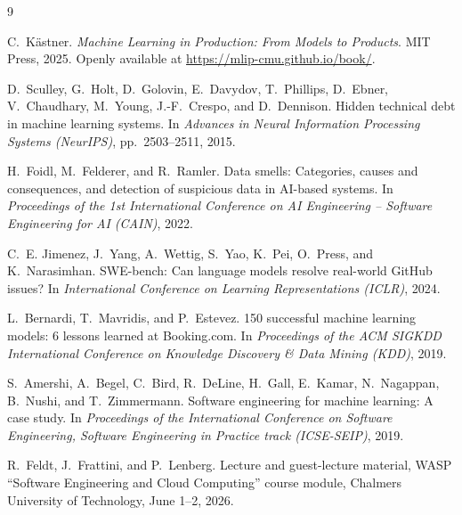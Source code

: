 \documentclass[11pt,a4paper]{article}
\begin{document}
\begin{thebibliography}{9}\itemsep2pt 

C.~K\"astner.
\emph{Machine Learning in Production: From Models to Products}.
MIT Press, 2025. Openly available at \url{https://mlip-cmu.github.io/book/}.

D.~Sculley, G.~Holt, D.~Golovin, E.~Davydov, T.~Phillips, D.~Ebner, V.~Chaudhary, M.~Young, J.-F.~Crespo, and D.~Dennison.
Hidden technical debt in machine learning systems.
In \emph{Advances in Neural Information Processing Systems (NeurIPS)}, pp.~2503--2511, 2015.

H.~Foidl, M.~Felderer, and R.~Ramler.
Data smells: Categories, causes and consequences, and detection of suspicious data in AI-based systems.
In \emph{Proceedings of the 1st International Conference on AI Engineering -- Software Engineering for AI (CAIN)}, 2022.

C.~E. Jimenez, J.~Yang, A.~Wettig, S.~Yao, K.~Pei, O.~Press, and K.~Narasimhan.
SWE-bench: Can language models resolve real-world GitHub issues?
In \emph{International Conference on Learning Representations (ICLR)}, 2024.

L.~Bernardi, T.~Mavridis, and P.~Estevez.
150 successful machine learning models: 6 lessons learned at Booking.com.
In \emph{Proceedings of the ACM SIGKDD International Conference on Knowledge Discovery \& Data Mining (KDD)}, 2019.

S.~Amershi, A.~Begel, C.~Bird, R.~DeLine, H.~Gall, E.~Kamar, N.~Nagappan, B.~Nushi, and T.~Zimmermann.
Software engineering for machine learning: A case study.
In \emph{Proceedings of the International Conference on Software Engineering, Software Engineering in Practice track (ICSE-SEIP)}, 2019.

R.~Feldt, J.~Frattini, and P.~Lenberg.
Lecture and guest-lecture material, WASP ``Software Engineering and Cloud Computing'' course module, Chalmers University of Technology, June 1--2, 2026.

\end{thebibliography}
\end{document}
